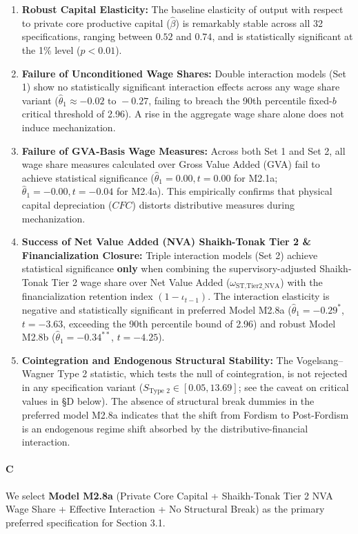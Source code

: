 \begin{enumerate}
	\item \textbf{Robust Capital Elasticity:} The baseline elasticity of output with respect to private core productive capital ($\hat{\beta}$) is remarkably stable across all 32 specifications, ranging between $0.52$ and $0.74$, and is statistically significant at the 1\% level ($p < 0.01$).
	\item \textbf{Failure of Unconditioned Wage Shares:} Double interaction models (Set 1) show no statistically significant interaction effects across any wage share variant ($\hat{\theta}_1 \approx -0.02 \text{ to } -0.27$, failing to breach the 90th percentile fixed-$b$ critical threshold of 2.96). A rise in the aggregate wage share alone does not induce mechanization.
	\item \textbf{Failure of GVA-Basis Wage Measures:} Across both Set 1 and Set 2, all wage share measures calculated over Gross Value Added (GVA) fail to achieve statistical significance ($\hat{\theta}_1 = 0.00, t = 0.00$ for M2.1a; $\hat{\theta}_1 = -0.00, t = -0.04$ for M2.4a). This empirically confirms that physical capital depreciation ($CFC$) distorts distributive measures during mechanization.
	\item \textbf{Success of Net Value Added (NVA) Shaikh-Tonak Tier 2 \& Financialization Closure:} Triple interaction models (Set 2) achieve statistical significance \textbf{only} when combining the supervisory-adjusted Shaikh-Tonak Tier 2 wage share over Net Value Added ($\omega_{\text{ST,Tier2\_NVA}}$) with the financialization retention index $(1 - \iota_{t-1})$. The interaction elasticity is negative and statistically significant in preferred Model M2.8a ($\hat{\theta}_1 = -0.29^*$, $t = -3.63$, exceeding the 90th percentile bound of 2.96) and robust Model M2.8b ($\hat{\theta}_1 = -0.34^{**}$, $t = -4.25$).
	\item \textbf{Cointegration and Endogenous Structural Stability:} The Vogelsang--Wagner Type 2 statistic, which tests the null of cointegration, is not rejected in any specification variant ($S_{\text{Type 2}} \in [0.05, 13.69]$; see the caveat on critical values in §D below). The absence of structural break dummies in the preferred model M2.8a indicates that the shift from Fordism to Post-Fordism is an endogenous regime shift absorbed by the distributive-financial interaction.
\end{enumerate}

\paragraph{C}
We select \textbf{Model M2.8a} (Private Core Capital + Shaikh-Tonak Tier 2 NVA Wage Share + Effective Interaction + No Structural Break) as the primary preferred specification for Section 3.1.

